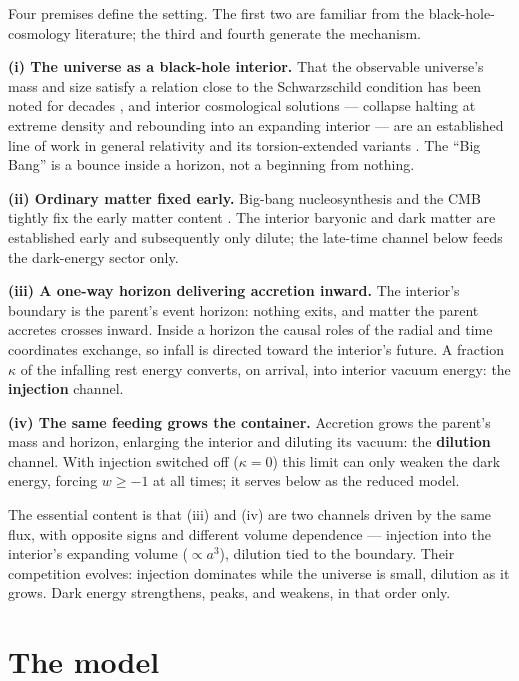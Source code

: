 \documentclass[11pt,a4paper]{article}
\begin{document}
Four premises define the setting. The first two are familiar from the black-hole-cosmology literature; the third and fourth generate the mechanism.

\textbf{(i) The universe as a black-hole interior.} That the observable universe's mass and size satisfy a relation close to the Schwarzschild condition has been noted for decades \citep{Pathria1972}, and interior cosmological solutions --- collapse halting at extreme density and rebounding into an expanding interior --- are an established line of work in general relativity and its torsion-extended variants \citep{NovelloBergliaffa2008,Poplawski2010}. The ``Big Bang'' is a bounce inside a horizon, not a beginning from nothing.

\textbf{(ii) Ordinary matter fixed early.} Big-bang nucleosynthesis and the CMB tightly fix the early matter content \citep{Fields2020,Planck2018}. The interior baryonic and dark matter are established early and subsequently only dilute; the late-time channel below feeds the dark-energy sector only.

\textbf{(iii) A one-way horizon delivering accretion inward.} The interior's boundary is the parent's event horizon: nothing exits, and matter the parent accretes crosses inward. Inside a horizon the causal roles of the radial and time coordinates exchange, so infall is directed toward the interior's future. A fraction $\kappa$ of the infalling rest energy converts, on arrival, into interior vacuum energy: the \textbf{injection} channel.

\textbf{(iv) The same feeding grows the container.} Accretion grows the parent's mass and horizon, enlarging the interior and diluting its vacuum: the \textbf{dilution} channel. With injection switched off ($\kappa=0$) this limit can only weaken the dark energy, forcing $w\ge-1$ at all times; it serves below as the reduced model.

The essential content is that (iii) and (iv) are two channels driven by the same flux, with opposite signs and different volume dependence --- injection into the interior's expanding volume ($\propto a^3$), dilution tied to the boundary. Their competition evolves: injection dominates while the universe is small, dilution as it grows. Dark energy strengthens, peaks, and weakens, in that order only.

\section{The model}\label{sec:model}
\end{document}

